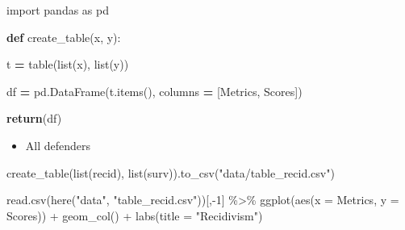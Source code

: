 \documentclass[
]{book}
\newenvironment{Shaded}{\begin{snugshade}}{\end{snugshade}}
\newcommand{\AttributeTok}[1]{\textcolor[rgb]{0.77,0.63,0.00}{#1}}
\newcommand{\BuiltInTok}[1]{#1}
\newcommand{\ControlFlowTok}[1]{\textcolor[rgb]{0.13,0.29,0.53}{\textbf{#1}}}
\newcommand{\DecValTok}[1]{\textcolor[rgb]{0.00,0.00,0.81}{#1}}
\newcommand{\FunctionTok}[1]{\textcolor[rgb]{0.00,0.00,0.00}{#1}}
\newcommand{\ImportTok}[1]{#1}
\newcommand{\KeywordTok}[1]{\textcolor[rgb]{0.13,0.29,0.53}{\textbf{#1}}}
\newcommand{\NormalTok}[1]{#1}
\newcommand{\OperatorTok}[1]{\textcolor[rgb]{0.81,0.36,0.00}{\textbf{#1}}}
\newcommand{\SpecialCharTok}[1]{\textcolor[rgb]{0.00,0.00,0.00}{#1}}
\newcommand{\StringTok}[1]{\textcolor[rgb]{0.31,0.60,0.02}{#1}}
\providecommand{\tightlist}{%
  \setlength{\itemsep}{0pt}\setlength{\parskip}{0pt}}
\begin{document}
\begin{Shaded}
\begin{Highlighting}[]

\ImportTok{import}\NormalTok{ pandas }\ImportTok{as}\NormalTok{ pd }

\KeywordTok{def}\NormalTok{ create\_table(x, y):}

\NormalTok{  t }\OperatorTok{=}\NormalTok{ table(}\BuiltInTok{list}\NormalTok{(x), }\BuiltInTok{list}\NormalTok{(y))}
  
\NormalTok{  df }\OperatorTok{=}\NormalTok{ pd.DataFrame(t.items(), }
\NormalTok{             columns }\OperatorTok{=}\NormalTok{ [}\StringTok{\textquotesingle{}Metrics\textquotesingle{}}\NormalTok{, }\StringTok{\textquotesingle{}Scores\textquotesingle{}}\NormalTok{])}
             
  \ControlFlowTok{return}\NormalTok{(df)}
             
\end{Highlighting}
\end{Shaded}

\begin{itemize}
\tightlist
\item
  All defenders
\end{itemize}

\begin{Shaded}
\begin{Highlighting}[]

\NormalTok{create\_table(}\BuiltInTok{list}\NormalTok{(recid), }\BuiltInTok{list}\NormalTok{(surv)).to\_csv(}\StringTok{"data/table\_recid.csv"}\NormalTok{)}
\end{Highlighting}
\end{Shaded}

\begin{Shaded}
\begin{Highlighting}[]
\FunctionTok{read.csv}\NormalTok{(}\FunctionTok{here}\NormalTok{(}\StringTok{"data"}\NormalTok{, }\StringTok{"table\_recid.csv"}\NormalTok{))[,}\SpecialCharTok{{-}}\DecValTok{1}\NormalTok{] }\SpecialCharTok{\%\textgreater{}\%}
  \FunctionTok{ggplot}\NormalTok{(}\FunctionTok{aes}\NormalTok{(}\AttributeTok{x =}\NormalTok{ Metrics, }\AttributeTok{y =}\NormalTok{ Scores)) }\SpecialCharTok{+}
  \FunctionTok{geom\_col}\NormalTok{() }\SpecialCharTok{+}
  \FunctionTok{labs}\NormalTok{(}\AttributeTok{title =} \StringTok{"Recidivism"}\NormalTok{)}
\end{Highlighting}
\end{Shaded}
\end{document}
